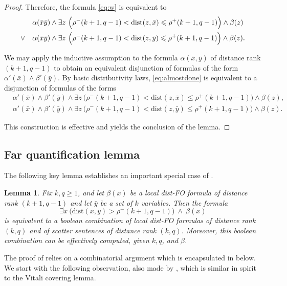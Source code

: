 \documentclass[11pt]{article}
\newtheorem{lemma}[theorem]{Lemma}
\theoremstyle{remark}
\renewcommand{\le}{\leqslant}
\renewcommand{\ge}{\geqslant}
\newcommand{\dist}{\mathrm{dist}}
\newcommand{\distFO}{\textrm{\upshape dist-FO}\xspace}
\newcommand{\tup}{\bar}
\begin{document}
\begin{proof}
Therefore, the formula \eqref{eq:w}
is equivalent to
\begin{align}\label{eq:almostdone}
\alpha(\tup x\tup y)\land \exists z~& \Big(\rho^-(k+1,q-1)<\dist(z,\tup x )\le \rho^+(k+1,q-1)\Big)\land  \beta(z) \notag \\\lor\quad
\alpha(\tup x\tup y)\land \exists z~& \Big(\rho^-(k+1,q-1)<\dist(z,\tup y)\le \rho^+(k+1,q-1)\Big)\land  \beta(z).
\end{align}

We may apply the inductive assumption to the formula $\alpha(\tup x,\tup y)$ of distance rank \((k+1,q-1)\) to obtain an equivalent
disjunction of formulas of the form \(\alpha'(\bar x) \land \beta'(\bar y)\).
By basic distributivity laws, \eqref{eq:almostdone} is equivalent to a disjunction of formulas of the forms
\begin{align*}
& \alpha'(\tup x) \land \beta'(\tup y)\land \exists z~ \Big(\rho^-(k+1,q-1)<\dist(z,\tup x )\le \rho^+(k+1,q-1)\Big)\land  \beta(z), \\
& \alpha'(\tup x) \land \beta'(\tup y)\land \exists z~ \Big(\rho^-(k+1,q-1)<\dist(z,\tup y )\le \rho^+(k+1,q-1)\Big)\land  \beta(z).
\end{align*}

This construction is effective and yields the conclusion of the lemma.
 \end{proof}

\subsection{Far quantification lemma}
The following key lemma establishes an important special case of .
\begin{lemma}\label{lem:submain}
    Fix $k,q\ge 1$, and let $\beta(x)$ be a local \distFO formula of  distance rank $(k+1,q-1)$ and let $\bar y$ be a set of $k$ variables.
    Then the formula
    $$\exists x~\Big(\dist(x,\tup y)>\rho^-(k+1,q-1)\Big)\ \land\  \beta(x)$$
    is equivalent to a boolean combination of local \distFO formulas of
     distance rank $(k,q)$ and of scatter sentences of distance rank $(k,q)$.
    Moreover, this boolean combination can be effectively computed, given $k,q$, and $\beta$.
\end{lemma}


The proof of 
relies on a combinatorial argument which is encapsulated in  below.
We start with the following observation, also made by \cite[Lem. 3]{learningLogic},
which is similar in spirit to the Vitali covering lemma.
\end{document}
